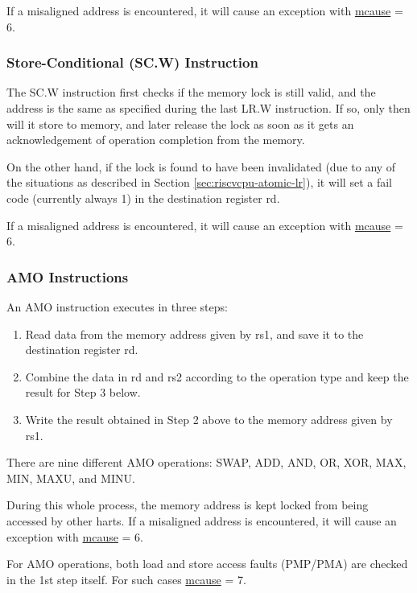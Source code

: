 \documentclass[main\_\_EN.tex]{subfiles}
\begin{document}
If a misaligned address is encountered, it will cause an exception with \hyperref[regdesc:MCAUSE]{mcause} = 6.

\subsubsection{Store-Conditional (SC.W) Instruction}
\label{sec:riscvcpu-atomic-sc}

The SC.W instruction first checks if the memory lock is still valid, and the address is the same as specified during the last LR.W instruction. If so, only then will it store to memory, and later release the lock as soon as it gets an acknowledgement of operation completion from the memory.

On the other hand, if the lock is found to have been invalidated (due to any of the situations as described in Section \ref{sec:riscvcpu-atomic-lr}), it will set a fail code (currently always 1) in the destination register rd.

If a misaligned address is encountered, it will cause an exception with \hyperref[regdesc:MCAUSE]{mcause} = 6.

\subsubsection{AMO Instructions}
\label{sec:riscvcpu-atomic-amo}

An AMO instruction executes in three steps:

\begin{enumerate}
    \item Read data from the memory address given by rs1, and save it to the destination register rd.
    \item Combine the data in rd and rs2 according to the operation type and keep the result for Step 3 below.
    \item Write the result obtained in Step 2 above to the memory address given by rs1.
\end{enumerate}

There are nine different AMO operations: SWAP, ADD, AND, OR, XOR, MAX, MIN, MAXU, and MINU.

During this whole process, the memory address is kept locked from being accessed by other harts. If a misaligned address is encountered, it will cause an exception with \hyperref[regdesc:MCAUSE]{mcause} = 6.

For AMO operations, both load and store access faults (PMP/PMA) are checked in the 1st step itself. For such cases \hyperref[regdesc:MCAUSE]{mcause} = 7.
\end{document}
